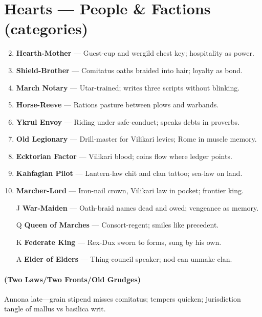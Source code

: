 \section*{Hearts --- People \& Factions (categories)}
\label{sec:vilikari-people}
\begin{enumerate}
\setcounter{enumi}{1}
\item \textbf{Hearth-Mother} --- Guest-cup and wergild chest key; hospitality as power.
\item \textbf{Shield-Brother} --- Comitatus oaths braided into hair; loyalty as bond.
\item \textbf{March Notary} --- Utar-trained; writes three scripts without blinking.
\item \textbf{Horse-Reeve} --- Rations pasture between plows and warbands.
\item \textbf{Ykrul Envoy} --- Riding under safe-conduct; speaks debts in proverbs.
\item \textbf{Old Legionary} --- Drill-master for Vilikari levies; Rome in muscle memory.
\item \textbf{Ecktorian Factor} --- Vilikari blood; coins flow where ledger points.
\item \textbf{Kahfagian Pilot} --- Lantern-law chit and clan tattoo; sea-law on land.
\item \textbf{Marcher-Lord} --- Iron-nail crown, Vilikari law in pocket; frontier king.
\item[J] \textbf{War-Maiden} --- Oath-braid names dead and owed; vengeance as memory.
\item[Q] \textbf{Queen of Marches} --- Consort-regent; smiles like precedent.
\item[K] \textbf{Federate King} --- Rex-Dux sworn to forms, sung by his own.
\item[A] \textbf{Elder of Elders} --- Thing-council speaker; nod can unmake clan.
\end{enumerate}

\paragraph*{(Two Laws/Two Fronts/Old Grudges)} Annona late---grain stipend misses comitatus; tempers quicken; jurisdiction tangle of mallus vs basilica writ.

